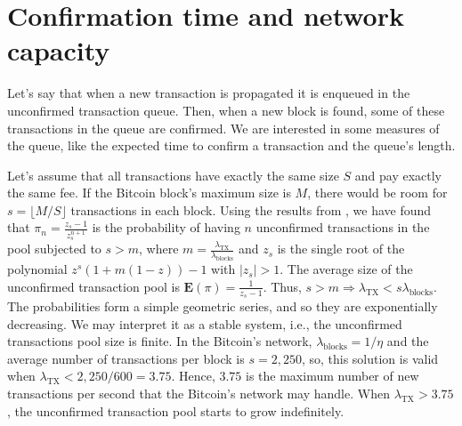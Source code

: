 


\section{Confirmation time and network capacity}

Let's say that when a new transaction is propagated it is enqueued in the unconfirmed transaction queue. Then, when a new block is found, some of these transactions in the queue are confirmed. We are interested in some measures of the queue, like the expected time to confirm a transaction and the queue's length.

Let's assume that all transactions have exactly the same size $S$ and pay exactly the same fee. If the Bitcoin block's maximum size is $M$, there would be room for $s = \lfloor M/S \rfloor$ transactions in each block. Using the results from \citet{bailey1954queueing}, we have found that $\pi_n = \frac{z_s-1}{z_s^{n+1}}$ is the probability of having $n$ unconfirmed transactions in the pool subjected to $s > m$, where $m=\frac{\lambda_{\text{TX}}}{\lambda_{\text{blocks}}}$ and $z_s$ is the single root of the polynomial $z^s(1+m(1-z))-1$ with $|z_s|>1$. The average size of the unconfirmed transaction pool is $\mathbf{E}(\pi) = \frac{1}{z_s - 1}$. Thus, $s > m \Rightarrow \lambda_{\text{TX}} < s \lambda_{\text{blocks}}$. The probabilities form a simple geometric series, and so they are exponentially decreasing. We may interpret it as a stable system, i.e., the unconfirmed transactions pool size is finite. In the Bitcoin's network, $\lambda_{\text{blocks}} = 1/\eta$ and the average number of transactions per block is $s=2,250$, so, this solution is valid when $\lambda_{\text{TX}} < 2,250/600 = 3.75$. Hence, $3.75$ is the maximum number of new transactions per second that the Bitcoin's network may handle. When $\lambda_{\text{TX}} > 3.75$, the unconfirmed transaction pool starts to grow indefinitely.

